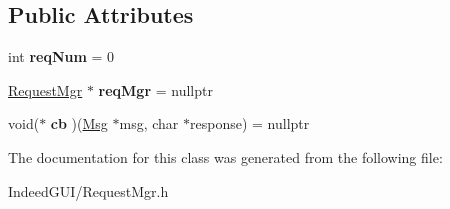 \subsection*{Public Attributes}
\begin{DoxyCompactItemize}
\item 
\hypertarget{class_msg_aa19e546aac8d7509477387d572c4c151}{}int {\bfseries req\+Num} = 0\label{class_msg_aa19e546aac8d7509477387d572c4c151}

\item 
\hypertarget{class_msg_afc6f2594fd270800a08a6cfd0b2cbb8f}{}\hyperlink{class_request_mgr}{Request\+Mgr} $\ast$ {\bfseries req\+Mgr} = nullptr\label{class_msg_afc6f2594fd270800a08a6cfd0b2cbb8f}

\item 
\hypertarget{class_msg_a1bf8c69296167a6eb4d78adc236cc520}{}void($\ast$ {\bfseries cb} )(\hyperlink{class_msg}{Msg} $\ast$msg, char $\ast$response) = nullptr\label{class_msg_a1bf8c69296167a6eb4d78adc236cc520}

\end{DoxyCompactItemize}


The documentation for this class was generated from the following file\+:\begin{DoxyCompactItemize}
\item 
Indeed\+G\+U\+I/Request\+Mgr.\+h\end{DoxyCompactItemize}
